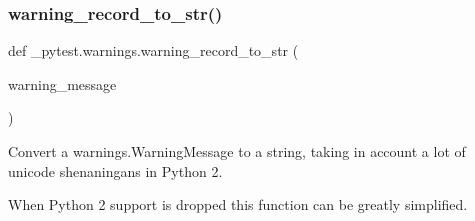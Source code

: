\subsubsection{\texorpdfstring{warning\+\_\+record\+\_\+to\+\_\+str()}{warning\_record\_to\_str()}}
{\footnotesize\ttfamily def \+\_\+pytest.\+warnings.\+warning\+\_\+record\+\_\+to\+\_\+str (\begin{DoxyParamCaption}\item[{}]{warning\+\_\+message }\end{DoxyParamCaption})}

\begin{DoxyVerb}Convert a warnings.WarningMessage to a string, taking in account a lot of unicode shenaningans in Python 2.

When Python 2 support is dropped this function can be greatly simplified.
\end{DoxyVerb}
 
